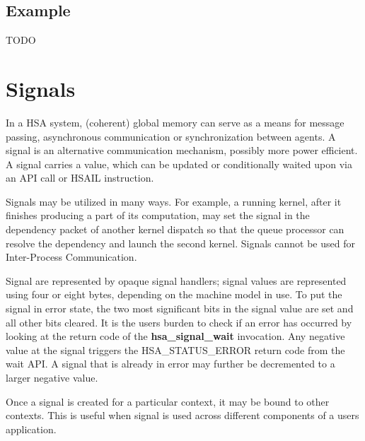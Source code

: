\documentclass[draft]{book}
\newcommand{\mariotodo}[1]{\todo[color=CarnationPink]{#1}}
\newcommand{\reffun}[1]{\textbf{#1}}
\newcommand{\reftyp}[1]{#1}
\newcommand{\refenu}[1]{\reftyp{#1}}
\begin{document}

% 

\hypertarget{topology_example}{} \subsection{Example}
TODO

\hypertarget{signals}{}\section{Signals}
\label{signals}

In a HSA system, (coherent) global memory can serve as a means for message
passing, asynchronous communication or synchronization between agents. A signal
is an alternative communication mechanism, possibly more power efficient. A
signal carries a value, which can be updated or conditionally waited upon via an
API call or HSAIL instruction.

Signals may be utilized in many ways. For example, a running kernel, after it
finishes producing a part of its computation, may set the signal in the
dependency packet of another kernel dispatch so that the queue processor can
resolve the dependency and launch the second kernel. Signals cannot be used for
Inter-Process Communication.

Signal are represented by opaque signal handlers; signal values are represented
using four or eight bytes, depending on the machine model in use. To put the
signal in error state, the two most significant bits in the signal value are set
and all other bits cleared. It is the users burden to check if an error has
occurred by looking at the return code of the \reffun{hsa_signal_wait}
invocation. Any negative value at the signal triggers the
\refenu{HSA_STATUS_ERROR} return code from the wait API. A signal that is
already in error may further be decremented to a larger negative value.

\mariotodo{signal creation missing}Once a signal is created for a particular
context, it may be bound to other contexts. This is useful when signal is used
across different components of a users application.
\end{document}
